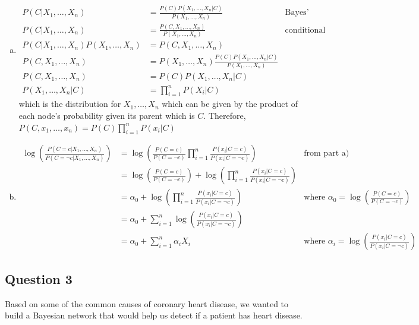 \documentclass{article}
\begin{document}
\begin{enumerate}[a)]
\item
\begin{align*}
P(C | X_1, \ldots , X_n) &= \frac{P(C) P(X_1, \ldots , X_n | C)}{P(X_1, \ldots , X_n)} & \text{Bayes' Theorem} \\
P(C | X_1, \ldots , X_n) &= \frac{P(C, X_1, \ldots , X_n)}{P(X_1, \ldots , X_n)} & \text{conditional probability} \\
P(C | X_1, \ldots , X_n) P(X_1, \ldots , X_n) &= P(C, X_1, \ldots , X_n) \\
P(C, X_1, \ldots , X_n) &=  P(X_1, \ldots , X_n) \frac{P(C) P(X_1, \ldots , X_n | C)}{P(X_1, \ldots , X_n)} \\
P(C, X_1, \ldots , X_n) &=  P(C) P(X_1, \ldots , X_n | C) \\ 
P(X_1, \ldots , X_n | C) &=  \prod_{i=1}^n P(X_i | C) 
\end{align*}
which is the distribution for $X_1, \ldots, X_n$ which can be given by the product of each node's probability given its parent which is $C$.
Therefore,
$P(C, x_1, \ldots , x_n) =  P(C) \prod_{i=1}^n P(x_i | C) $
\item
\begin{align*}
\log{\left(\frac{P(C = c | X_1, \ldots, X_n)}{P(C = \neg c | X_1, \ldots, X_n)}\right)} &= \log{\left(\frac{P(C=c)}{P(C=\neg c)} \prod_{i=1}^n \frac{P(x_i | C = c)}{P(x_i | C = \neg c)}\right)} & \text{from part a)} \\
&= \log{\left(\frac{P(C=c)}{P(C=\neg c)}\right)} + \log{\left(\prod_{i=1}^n \frac{P(x_i | C = c)}{P(x_i | C = \neg c)}\right)} \\
&= \alpha_0 + \log{\left(\prod_{i=1}^n \frac{P(x_i | C = c)}{P(x_i | C = \neg c)}\right)} & \text{where } \alpha_0 = \log{\left(\frac{P(C=c)}{P(C=\neg c)}\right)} \\
&= \alpha_0 + \sum_{i=1}^n \log{\left(\frac{P(x_i | C = c)}{P(x_i | C = \neg c)}\right)} \\
&= \alpha_0 + \sum_{i=1}^n \alpha_i X_i & \text{where } \alpha_i = \log{\left(\frac{P(x_i | C = c)}{P(x_i | C = \neg c)}\right)}
\end{align*}
\end{enumerate}

\subsection{Question 3}
Based on some of the common causes of coronary heart disease, we wanted to build a Bayesian network that would help us detect if a patient has heart disease.
\end{document}
